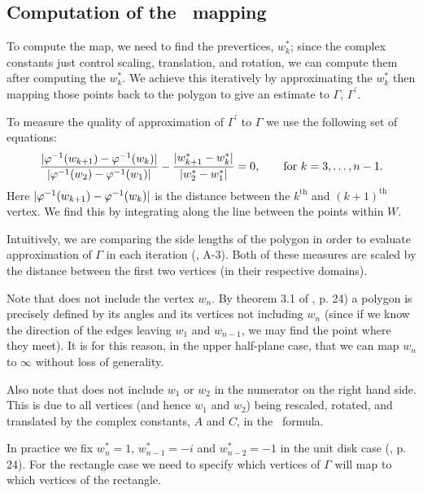 \subsection{Computation of the \sch\ mapping}

To compute the map, we need to find the prevertices, $w^*_k$; since the complex constants just control scaling, translation, and rotation, we can compute them after computing the $w^*_k$. We achieve this iteratively by approximating the $w^*_k$ then mapping those points back to the polygon to give an estimate to $\Gamma$, $\Gamma^\prime$. 

To measure the quality of approximation of $\Gamma^\prime$ to $\Gamma$ we use the following set of equations:
\begin{equation}
\label{optimizeme}
\frac{\vert \varphi^{-1}(w_{k+1}) -  \varphi^{-1}(w_k) \vert}{\vert \varphi^{-1}(w_2)-\varphi^{-1}(w_1)\vert} - \frac{\vert w^*_{k+1} - w^*_k\vert}{\vert w^*_2 - w^*_1\vert} = 0, \qquad \text{for } k=3,\dots,n-1.
\end{equation}
Here $\vert \varphi^{-1}(w_{k+1}) -  \varphi^{-1}(w_k) \vert$ is the distance between the $k^{\text{th}}$ and $(k+1)^{\text{th}}$ vertex.  We find this by integrating along the line between the points within $W$.

Intuitively, we are comparing the side lengths of the polygon in order to evaluate approximation of $\Gamma$ in each iteration (\cite{snider}, A-3). Both of these measures are scaled by the distance between the first two vertices (in their respective domains).

Note that  does not include the vertex $w_n$. By theorem 3.1 of \cite{driscoll}, p. 24) a polygon is precisely defined by its angles and its vertices not including $w_n$ (since if we know the direction of the edges leaving $w_1$ and $w_{n-1}$, we may find the point where they meet). It is for this reason, in the upper half-plane case, that we can map $w_n$ to $\infty$ without loss of generality.

Also note that  does not include $w_1$ or $w_2$ in the numerator on the right hand side. This is due to all vertices (and hence $w_1$ and $w_2$) being rescaled, rotated, and translated by the complex constants, $A$ and $C$, in the \sch\ formula.

In practice we fix $w^*_n=1$, $w^*_{n-1}=-i$ and $w^*_{n-2}=-1$ in the unit disk case (\cite{driscoll}, p. 24). For the rectangle case we need to specify which vertices of $\Gamma$ will map to which vertices of the rectangle.

